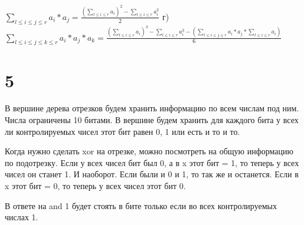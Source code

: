 \documentclass[12pt]{extarticle}
\begin{document}
$\sum\limits_{l \le i \le j \le r} a_i * a_j = \frac{(\sum\limits_{l \le i \le r} a_i) ^ 2 - \sum\limits_{l \le i \le r} a_i^2}{2}$
\newline
г) $\sum\limits_{l \le i \le j \le k \le r} a_i * a_j * a_k = \frac{(\sum\limits_{l \le i \le r} a_i) ^ 3 - \sum\limits_{l \le i \le r} a_i^3 - \left( \sum\limits_{l \le i \le j \le r} a_i * a_j * \sum\limits_{l \le i \le r} a_i \right)}{6}$


\section*{5}
В вершине дерева отрезков будем хранить информацию по всем числам под ним. Числа ограничены 10 битами. В вершине будем хранить для каждого бита у всех ли контролируемых чисел этот бит равен 0, 1 или есть и то и то. 

Когда нужно сделать xor на отрезке, можно посмотреть на общую информацию по подотрезку. Если у всех чисел бит был 0, а в x этот бит = 1, то теперь у всех чисел он станет 1. И наоборот. Если были и 0 и 1, то так же и останется. Если в x этот бит = 0, то теперь у всех чисел этот бит 0.

В ответе на and 1 будет стоять в бите только если во всех контролируемых числах 1.
\end{document}
